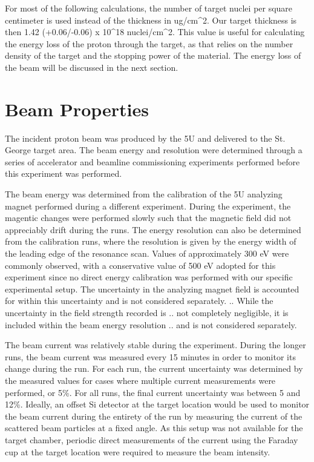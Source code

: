 For most of the following calculations, the number of target nuclei per
square centimeter is used instead of the thickness in ug/cm\^{}2. Our
target thickness is then 1.42 (+0.06/-0.06) x 10\^{}18 nuclei/cm\^{}2.
This value is useful for calculating the energy loss of the proton
through the target, as that relies on the number density of the target
and the stopping power of the material. The energy loss of the beam will
be discussed in the next section.

\section{Beam Properties}\label{beam-properties}

The incident proton beam was produced by the 5U and delivered to the St.
George target area. The beam energy and resolution were determined
through a series of accelerator and beamline commissioning experiments
performed before this experiment was performed.

The beam energy was determined from the calibration of the 5U analyzing
magnet performed during a different experiment. During the experiment,
the magentic changes were performed slowly such that the magnetic field
did not appreciably drift during the runs. The energy resolution can
also be determined from the calibration runs, where the resolution is
given by the energy width of the leading edge of the resonance scan.
Values of approximately 300 eV were commonly observed, with a
conservative value of 500 eV adopted for this experiment since no direct
energy calibration was performed with our specific experimental setup.
The uncertainty in the analyzing magnet field is accounted for within
this uncertainty and is not considered separately. .. While the
uncertainty in the field strength recorded is .. not completely
negligible, it is included within the beam energy resolution .. and is
not considered separately.

The beam current was relatively stable during the experiment. During the
longer runs, the beam current was measured every 15 minutes in order to
monitor its change during the run. For each run, the current uncertainty
was determined by the measured values for cases where multiple current
measurements were performed, or 5\%. For all runs, the final current
uncertainty was between 5 and 12\%. Ideally, an offset Si detector at
the target location would be used to monitor the beam current during the
entirety of the run by measuring the current of the scattered beam
particles at a fixed angle. As this setup was not available for the
target chamber, periodic direct measurements of the current using the
Faraday cup at the target location were required to measure the beam
intensity.

